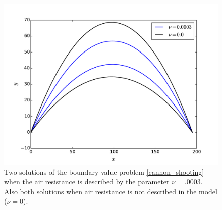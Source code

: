 \begin{figure}[ht]
\centering
\includegraphics[width=\textwidth]{Cannon_Shooting.pdf}
\caption{Two solutions of the boundary value problem \eqref{cannon_shooting} when the air resistance is described by the parameter $\nu = .0003$. Also both solutions when air resistance is not described in the model ($\nu = 0$).}
\label{shooting:cannon_comparison}
\end{figure}

